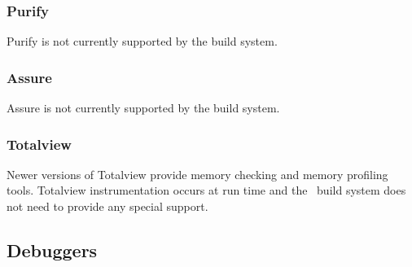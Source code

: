 \subsubsection{Purify}

Purify is not currently supported by the build system.




\subsubsection{Assure}

Assure is not currently supported by the build system.


\subsubsection{Totalview}

Newer versions of Totalview provide memory checking and memory
profiling tools.  Totalview instrumentation occurs at run time and the
\draco\ build system does not need to provide any special support.



\subsection{Debuggers}

